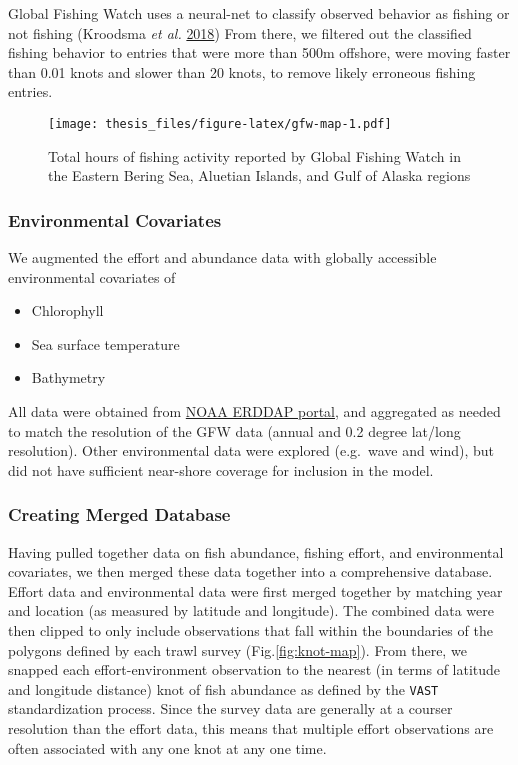 \documentclass[twoside,12pt,final]{ucthesis-CA2012}
\providecommand{\tightlist}{%
  \setlength{\itemsep}{0pt}\setlength{\parskip}{0pt}}
\begin{document}
\begin{ucmainmatter}
Global Fishing Watch uses a neural-net to classify observed behavior as
fishing or not fishing (Kroodsma \emph{et al.}
\protect\hyperlink{ref-Kroodsma2018}{2018}) From there, we filtered out
the classified fishing behavior to entries that were more than 500m
offshore, were moving faster than 0.01 knots and slower than 20 knots,
to remove likely erroneous fishing entries.
\begin{figure}
\centering
\texttt{[image: thesis\_files/figure-latex/gfw-map-1.pdf]}
\caption{\label{fig:gfw-map}Total hours of fishing activity reported by
Global Fishing Watch in the Eastern Bering Sea, Aluetian Islands, and
Gulf of Alaska regions}
\end{figure}
\subsubsection{Environmental Covariates}\label{environmental-covariates}

We augmented the effort and abundance data with globally accessible
environmental covariates of
\begin{itemize}
\tightlist
\item
  Chlorophyll
\item
  Sea surface temperature
\item
  Bathymetry
\end{itemize}
All data were obtained from
\href{https://coastwatch.pfeg.noaa.gov/erddap/index.html}{NOAA ERDDAP
portal}, and aggregated as needed to match the resolution of the GFW
data (annual and 0.2 degree lat/long resolution). Other environmental
data were explored (e.g.~wave and wind), but did not have sufficient
near-shore coverage for inclusion in the model.

\subsubsection{Creating Merged Database}\label{creating-merged-database}

Having pulled together data on fish abundance, fishing effort, and
environmental covariates, we then merged these data together into a
comprehensive database. Effort data and environmental data were first
merged together by matching year and location (as measured by latitude
and longitude). The combined data were then clipped to only include
observations that fall within the boundaries of the polygons defined by
each trawl survey (Fig.\ref{fig:knot-map}). From there, we snapped each
effort-environment observation to the nearest (in terms of latitude and
longitude distance) knot of fish abundance as defined by the
\texttt{VAST} standardization process. Since the survey data are
generally at a courser resolution than the effort data, this means that
multiple effort observations are often associated with any one knot at
any one time.


\end{ucmainmatter}
\end{document}
